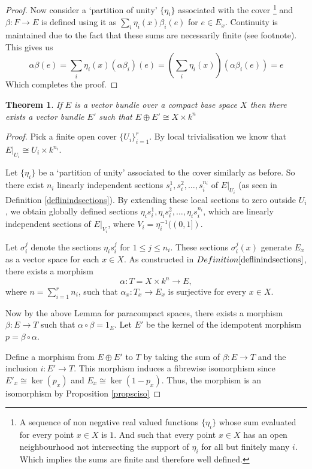 \documentclass[12pt]{report}
\numberwithin{equation}{section}
\newtheorem{theorem}[dummy]{Theorem}
\begin{document}
\begin{proof}
		Now consider a `partition of unity' $\{ \eta_i\}$ associated with the cover \footnote{A sequence of non negative real valued functions $\{\eta_i \}$ whose sum evaluated for every point $x \in X$ is $1$. And such that every point $x\in X$ has an open neighbourhood not intersecting the support of $\eta_i $ for all but finitely many $i$. Which implies the sums are finite and therefore well defined.} and $\beta:F \to E$ is defined using it as $\sum_{i} \eta_i(x)\beta_i(e)$ for $e\in E_x$. Continuity is maintained due to the fact that these sums are necessarily finite (see footnote). This gives us \[ \alpha \beta (e)= \sum_i \eta_i(x) (\alpha \beta_i) (e) = (\sum_i \eta_i(x)) (\alpha \beta_i (e)) = e \]
		Which completes the proof.
	\end{proof}
	
	\begin{theorem}\label{stablytrivialcompact}
		If $E$ is a vector bundle over a compact base space $X$ then there exists a vector bundle $E'$ such that $E \oplus E' \cong X \times k^n$
	\end{theorem}
	\begin{proof}
		Pick a finite open cover \( \{ U_i \}_{i=1}^r \). By local trivialisation we know that \( E|_{U_i} \cong U_i \times k^{n_i} \). 
		
		Let \( \{\eta_i\} \) be a `partition of unity' associated to the cover similarly as before. So there exist \( n_i \) linearly independent sections \( s_i^1, s_i^2, \dots, s_i^{n_i} \) of \( E|_{U_i} \) (as seen in Definition \ref{deflinindsections}). By extending these local sections to zero outside \( U_i \), we obtain globally defined sections \( \eta_i s_i^1, \eta_i s_i^2, \dots, \eta_i s_i^{n_i} \), which are linearly independent sections of \( E|_{V_i} \), where \( V_i = \eta_i^{-1}((0,1]) \).
		
		Let \( \sigma_i^j \) denote the sections \( \eta_i s_i^j \) for \( 1 \leq j \leq n_i \). These sections \( \sigma_i^j(x) \) generate \( E_x \) as a vector space for each \( x \in X \). As constructed in $Definition \ref{deflinindsections}$, there exists a morphism
		\[
		\alpha: T = X \times k^n \to E,
		\]
		where \( n = \sum_{i=1}^r n_i \), such that \( \alpha_x: T_x \to E_x \) is surjective for every \( x \in X \).
		
		Now by the above Lemma for paracompact spaces, there exists a morphism \( \beta: E \to T \) such that \( \alpha \circ \beta = 1_E \). Let \( E' \) be the kernel of the idempotent morphism \( p = \beta \circ \alpha \). 
		
		Define a morphism from \( E \oplus E' \) to \( T \) by taking the sum of $\beta: E\to T $ and the inclusion $i: E' \to T$. This morphism induces a fibrewise isomorphism since \( E'_x \cong \ker(p_x) \) and \( E_x \cong \ker(1-p_x) \). Thus, the morphism is an isomorphism by Proposition \ref{propsciso}	
	\end{proof}
	
\end{document}
